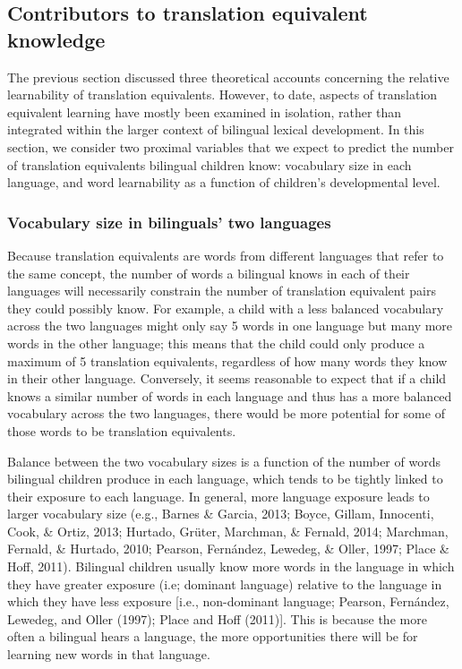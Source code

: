 \documentclass[
  english,
  ,man,floatsintext]{apa6}
\begin{document}
\hypertarget{contributors-to-translation-equivalent-knowledge}{%
\subsection{Contributors to translation equivalent knowledge}\label{contributors-to-translation-equivalent-knowledge}}

The previous section discussed three theoretical accounts concerning the relative learnability of translation equivalents. However, to date, aspects of translation equivalent learning have mostly been examined in isolation, rather than integrated within the larger context of bilingual lexical development. In this section, we consider two proximal variables that we expect to predict the number of translation equivalents bilingual children know: vocabulary size in each language, and word learnability as a function of children's developmental level.

\hypertarget{vocabulary-size-in-bilinguals-two-languages}{%
\subsubsection{Vocabulary size in bilinguals' two languages}\label{vocabulary-size-in-bilinguals-two-languages}}

Because translation equivalents are words from different languages that refer to the same concept, the number of words a bilingual knows in each of their languages will necessarily constrain the number of translation equivalent pairs they could possibly know. For example, a child with a less balanced vocabulary across the two languages might only say 5 words in one language but many more words in the other language; this means that the child could only produce a maximum of 5 translation equivalents, regardless of how many words they know in their other language. Conversely, it seems reasonable to expect that if a child knows a similar number of words in each language and thus has a more balanced vocabulary across the two languages, there would be more potential for some of those words to be translation equivalents.

Balance between the two vocabulary sizes is a function of the number of words bilingual children produce in each language, which tends to be tightly linked to their exposure to each language. In general, more language exposure leads to larger vocabulary size (e.g., Barnes \& Garcia, 2013; Boyce, Gillam, Innocenti, Cook, \& Ortiz, 2013; Hurtado, Grüter, Marchman, \& Fernald, 2014; Marchman, Fernald, \& Hurtado, 2010; Pearson, Fernández, Lewedeg, \& Oller, 1997; Place \& Hoff, 2011). Bilingual children usually know more words in the language in which they have greater exposure (i.e; dominant language) relative to the language in which they have less exposure {[}i.e., non-dominant language; Pearson, Fernández, Lewedeg, and Oller (1997); Place and Hoff (2011){]}. This is because the more often a bilingual hears a language, the more opportunities there will be for learning new words in that language.
\end{document}
